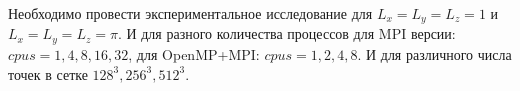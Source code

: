 \documentclass{article}
\begin{document}

    Необходимо провести экспериментальное исследование для \(L_x = L_y = L_z = 1\) и \(L_x = L_y = L_z = \pi\).
    И для разного количества процессов для MPI версии: \(cpus = 1, 4, 8, 16, 32\), для OpenMP+MPI: \(cpus = 1, 2, 4, 8\).
    И для различного числа точек в сетке \(128^3, 256^3, 512^3\).
\end{document}
